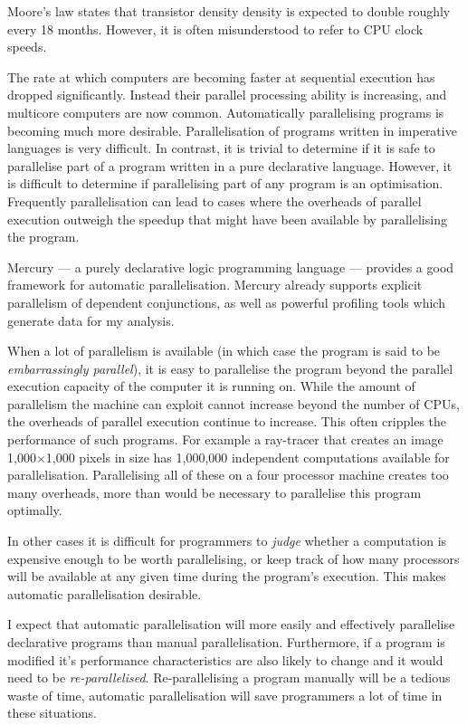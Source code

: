 %
%


Moore's law\cite{moore} states that transistor density density is
expected to double roughly every 18 months.
However, it is often misunderstood to refer to CPU clock speeds.


The rate at which computers are becoming faster at sequential
execution has dropped significantly.  Instead their parallel processing 
ability is increasing, and multicore computers are now common.
Automatically parallelising programs is becoming much more desirable.
Parallelisation of programs written in imperative languages is very
difficult.  In contrast, it is trivial to determine if it is safe to
parallelise part of a program written in a pure declarative language.
However, it is difficult to determine if parallelising part of any
program is an optimisation.  Frequently parallelisation can lead to
cases where the overheads of parallel execution outweigh the speedup
that might have been available by parallelising the program.

Mercury --- a purely declarative logic programming language ---
provides a good framework for automatic parallelisation.  Mercury
already supports explicit parallelism of dependent conjunctions, as
well as powerful profiling tools which generate data for my analysis.

When a lot of parallelism is available (in which case the program is said to
be \emph{embarrassingly parallel}), it is easy to parallelise the
program beyond the parallel execution capacity of the computer it is
running on.
While the amount of parallelism the machine can exploit
cannot increase beyond the number of CPUs,
the overheads of parallel execution continue to increase.
This often cripples the performance of such programs.
For example a ray-tracer that creates an image
1,000$\times$1,000 pixels in size has 1,000,000 independent computations
available for parallelisation.
Parallelising all of these on a four processor machine creates too
many overheads, more than would be necessary to parallelise this program
optimally.

In other cases it is difficult for programmers to \emph{judge} whether
a computation is expensive enough to be worth parallelising,
or keep track of how many processors will be available at any given
time during the program's execution.
This makes automatic parallelisation desirable.

I expect that automatic parallelisation will more easily and
effectively parallelise declarative programs than manual
parallelisation.
Furthermore, if a program is modified it's performance characteristics
are also likely to change and it would need to be
\emph{re-parallelised}.
Re-parallelising a program manually will be a tedious waste of time,
automatic parallelisation will save programmers a lot of time in these
situations.

